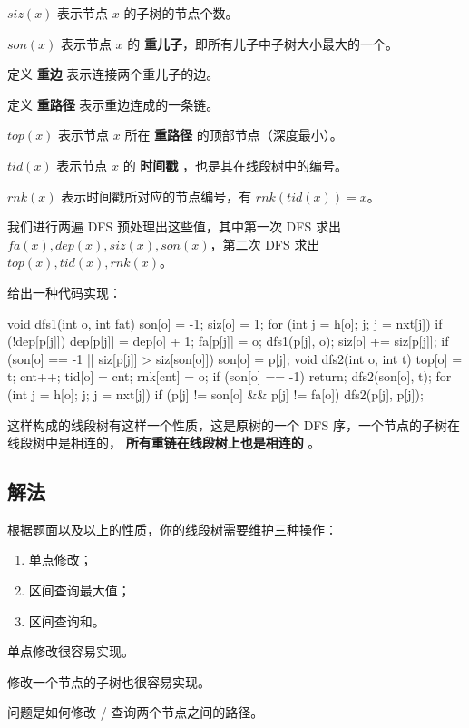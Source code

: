 $siz(x)$ 表示节点 $x$ 的子树的节点个数。

$son(x)$ 表示节点 $x$ 的 \textbf{重儿子}，即所有儿子中子树大小最大的一个。

定义 \textbf{重边} 表示连接两个重儿子的边。

定义 \textbf{重路径} 表示重边连成的一条链。

$top(x)$ 表示节点 $x$ 所在 \textbf{重路径} 的顶部节点（深度最小）。

$tid(x)$ 表示节点 $x$ 的 \textbf{时间戳} ，也是其在线段树中的编号。

$rnk(x)$ 表示时间戳所对应的节点编号，有 $rnk(tid(x))=x$。

我们进行两遍 DFS 预处理出这些值，其中第一次 DFS 求出 $fa(x),dep(x),siz(x),son(x)$，第二次 DFS 求出 $top(x),tid(x),rnk(x)$。

给出一种代码实现：

\begin{cppcode}
void dfs1(int o, int fat) {
  son[o] = -1;
  siz[o] = 1;
  for (int j = h[o]; j; j = nxt[j])
    if (!dep[p[j]]) {
      dep[p[j]] = dep[o] + 1;
      fa[p[j]] = o;
      dfs1(p[j], o);
      siz[o] += siz[p[j]];
      if (son[o] == -1 || siz[p[j]] > siz[son[o]]) son[o] = p[j];
    }
}
void dfs2(int o, int t) {
  top[o] = t;
  cnt++;
  tid[o] = cnt;
  rnk[cnt] = o;
  if (son[o] == -1) return;
  dfs2(son[o], t);
  for (int j = h[o]; j; j = nxt[j])
    if (p[j] != son[o] && p[j] != fa[o]) dfs2(p[j], p[j]);
}
\end{cppcode}

这样构成的线段树有这样一个性质，这是原树的一个 DFS 序，一个节点的子树在线段树中是相连的， \textbf{所有重链在线段树上也是相连的} 。

\subsection{解法}

根据题面以及以上的性质，你的线段树需要维护三种操作：

\begin{enumerate}
\item 单点修改；
\item 区间查询最大值；
\item 区间查询和。
\end{enumerate}

单点修改很容易实现。

修改一个节点的子树也很容易实现。

问题是如何修改 / 查询两个节点之间的路径。


